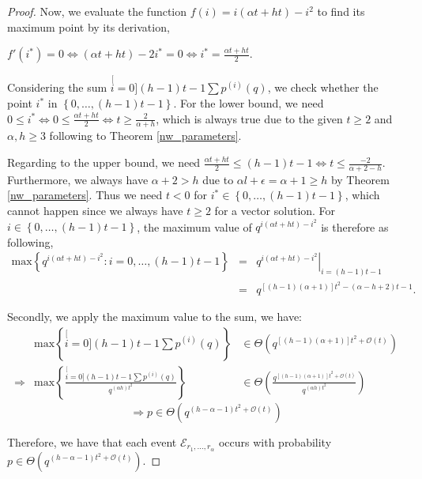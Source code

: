 \begin{proof}
Now, we evaluate the function $f(i)=i(\alpha t+ht)-i^{2}$ to find
its maximum point by its derivation, 

$f'(i^{*})=0\Leftrightarrow(\alpha t+ht)-2i^{*}=0\Leftrightarrow i^{*}=\frac{\alpha t+ht}{2}.$

Considering the sum $\stackrel[i=0]{(h-1)t-1}{\mathop{\sum}}p^{(i)}(q)$,
we check whether the point $i^{*}$ in $\left\{ 0,\ldots,(h-1)t-1\right\} $.
For the lower bound, we need $0\leq i^{*}\Leftrightarrow0\leq\frac{\alpha t+ht}{2}\Leftrightarrow t\geq\frac{2}{\alpha+h}$,
which is always true due to the given $t\geq2$ and $\alpha,h\geq3$
following to Theorem \ref{nw_parameters}.

Regarding to the upper bound, we need $\frac{\alpha t+ht}{2}\leq(h-1)t-1\Leftrightarrow t\leq\frac{-2}{\alpha+2-h}$.
Furthermore, we always have $\alpha+2>h$ due to $\alpha l+\epsilon=\alpha+1\geq h$
by Theorem \ref{nw_parameters}. Thus we need $t<0$ for $i^{*}\in\left\{ 0,\ldots,(h-1)t-1\right\} $,
which cannot happen since we always have $t\geq2$ for a vector solution.
For $i\in\left\{ 0,\ldots,(h-1)t-1\right\} $, the maximum value of
$q^{i(\alpha t+ht)-i^{2}}$ is therefore as following,
\begin{eqnarray*}
\mathrm{max}\left\{ q^{i(\alpha t+ht)-i^{2}}:i=0,\ldots,(h-1)t-1\right\}  & = & \left.q^{i(\alpha t+ht)-i^{2}}\right|_{i=(h-1)t-1}\\
 & = & q^{\left[\left(h-1\right)\left(\alpha+1\right)\right]t^{2}-\left(\alpha-h+2\right)t-1}.
\end{eqnarray*}

Secondly, we apply the maximum value to the sum, we have:
\begin{eqnarray*}
 & \mathrm{max}\left\{ \stackrel[i=0]{(h-1)t-1}{\mathop{\sum}}p^{(i)}(q)\right\}  & \in\Theta\left(q^{\left[\left(h-1\right)\left(\alpha+1\right)\right]t^{2}+\mathcal{O}(t)}\right)\\
\Rightarrow & \mathrm{max}\left\{ \frac{\stackrel[i=0]{(h-1)t-1}{\mathop{\sum}}p^{(i)}(q)}{q^{\left(\alpha h\right)t^{2}}}\right\}  & \in\Theta\left(\frac{q^{\left[\left(h-1\right)\left(\alpha+1\right)\right]t^{2}+\mathcal{O}(t)}}{q^{\left(\alpha h\right)t^{2}}}\right)
\end{eqnarray*}
\[
\Rightarrow p\in\Theta\left(q^{\left(h-\alpha-1\right)t^{2}+\mathcal{O}(t)}\right)
\]

Therefore, we have that each event $\mathcal{E}_{r_{1},\ldots,r_{\alpha}}$
 occurs with probability $p\in\Theta\left(q^{\left(h-\alpha-1\right)t^{2}+\mathcal{O}(t)}\right)$.
\end{proof}
